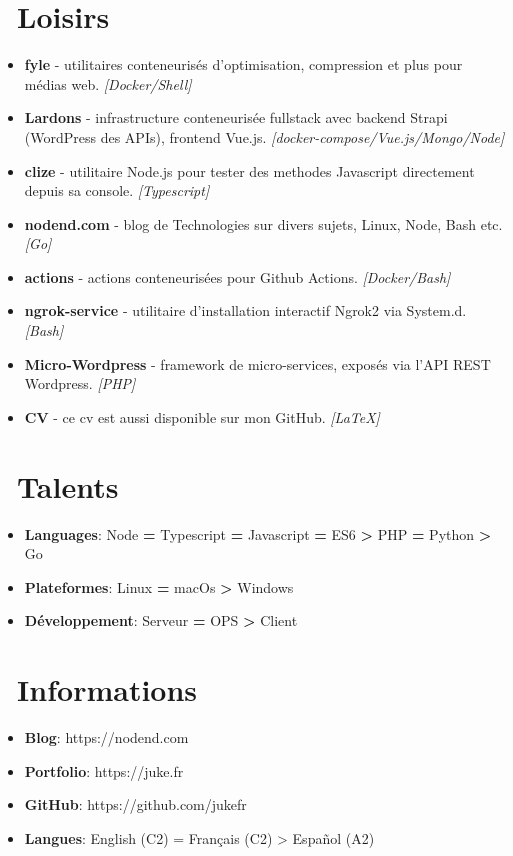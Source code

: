 \documentclass{resume}
\begin{document}
\section{\faGithub\ Loisirs}
\begin{itemize}
  \item \textbf{fyle} - utilitaires conteneurisés d'optimisation, compression et plus pour médias web. \textit{[Docker/Shell]}
  \item \textbf{Lardons} - infrastructure conteneurisée fullstack avec backend Strapi (WordPress des APIs), frontend Vue.js. \textit{[docker-compose/Vue.js/Mongo/Node]}
  \item \textbf{clize} - utilitaire Node.js pour tester des methodes Javascript directement depuis sa console. \textit{[Typescript]}
  \item \textbf{nodend.com} - blog de Technologies sur divers sujets, Linux, Node, Bash etc. \textit{[Go]}
  \item \textbf{actions} - actions conteneurisées pour Github Actions. \textit{[Docker/Bash]}
  \item \textbf{ngrok-service} - utilitaire d'installation interactif Ngrok2 via System.d. \textit{[Bash]}
  \item \textbf{Micro-Wordpress} - framework de micro-services, exposés via l'API REST Wordpress. \textit{[PHP]}
  \item \textbf{CV} - ce cv est aussi disponible sur mon GitHub. \textit{[LaTeX]}
\end{itemize}

\section{\faCogs\ Talents}
\begin{itemize}[parsep=0.5ex]
  \item \textbf{Languages}: Node \textbf{=} Typescript \textbf{=} Javascript \textbf{=} ES6 \textbf{>} PHP \textbf{=} Python \textbf{>} Go
  \item \textbf{Plateformes}: Linux \textbf{=} macOs \textbf{>} Windows
  \item \textbf{Développement}: Serveur \textbf{=} OPS \textbf{>} Client
\end{itemize}

\section{\faInfo\ Informations}
\begin{itemize}[parsep=0.5ex]
  \item \textbf{Blog}: https://nodend.com
  \item \textbf{Portfolio}: https://juke.fr
  \item \textbf{GitHub}: https://github.com/jukefr
  \item \textbf{Langues}: English (C2) = Français (C2) > Español (A2)
\end{itemize}
\end{document}
